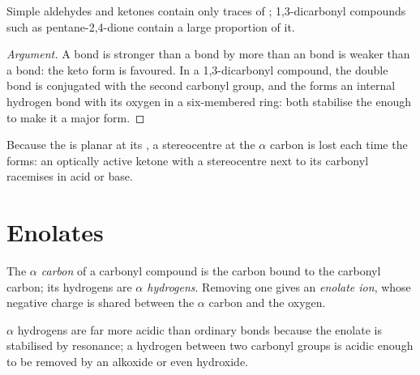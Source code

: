 \begin{proposition}\label{prop:b2:enolates-aldol:enol-content}
Simple aldehydes and ketones contain only traces of ; 1,3-dicarbonyl compounds such as
pentane-2,4-dione contain a large proportion of it.
\end{proposition}

\begin{proof}[Argument]
A  bond is stronger than a  bond by more than an  bond is weaker than a 
bond: the keto form is favoured. In a 1,3-dicarbonyl compound, the  double bond is conjugated
with the second carbonyl group, and the   forms an internal hydrogen bond with its oxygen
in a six-membered ring: both stabilise the  enough to make it a major form.
\end{proof}

Because the  is planar at its , a stereocentre at the $\alpha$ carbon is lost each time
the  forms: an optically active ketone with a stereocentre next to its carbonyl racemises in acid
or base.

\section{Enolates}

\begin{definition}[Enolates]\label{def:b2:enolates-aldol:enolate}
The \emph{$\alpha$ carbon} of a carbonyl compound is the carbon
bound to the carbonyl carbon; its hydrogens are \emph{$\alpha$ hydrogens}. Removing one gives an \emph{enolate ion}, whose
negative charge is shared between the $\alpha$ carbon and the oxygen.
\end{definition}

\begin{proposition}\label{prop:b2:enolates-aldol:alpha-acidity}
$\alpha$ hydrogens are far more acidic than ordinary  bonds because the enolate is stabilised
by resonance; a hydrogen between two carbonyl groups is acidic enough to be removed by an alkoxide or
even hydroxide.
\end{proposition}


